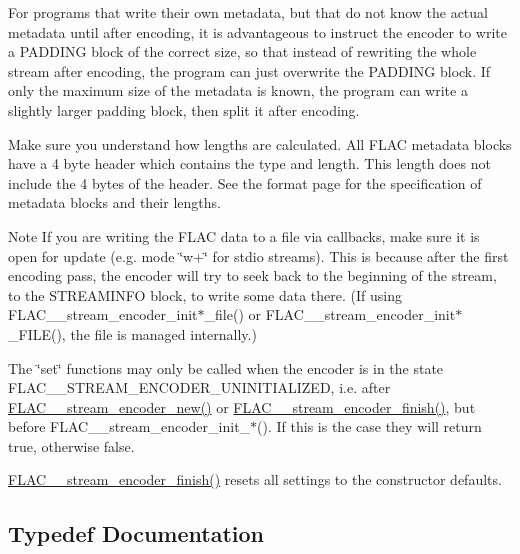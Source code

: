 For programs that write their own metadata, but that do not know the actual metadata until after encoding, it is advantageous to instruct the encoder to write a P\+A\+D\+D\+I\+NG block of the correct size, so that instead of rewriting the whole stream after encoding, the program can just overwrite the P\+A\+D\+D\+I\+NG block. If only the maximum size of the metadata is known, the program can write a slightly larger padding block, then split it after encoding.

Make sure you understand how lengths are calculated. All F\+L\+AC metadata blocks have a 4 byte header which contains the type and length. This length does not include the 4 bytes of the header. See the format page for the specification of metadata blocks and their lengths.

\begin{DoxyNote}{Note}
If you are writing the F\+L\+AC data to a file via callbacks, make sure it is open for update (e.\+g. mode \char`\"{}w+\char`\"{} for stdio streams). This is because after the first encoding pass, the encoder will try to seek back to the beginning of the stream, to the S\+T\+R\+E\+A\+M\+I\+N\+FO block, to write some data there. (If using F\+L\+A\+C\+\_\+\+\_\+stream\+\_\+encoder\+\_\+init$\ast$\+\_\+file() or F\+L\+A\+C\+\_\+\+\_\+stream\+\_\+encoder\+\_\+init$\ast$\+\_\+\+F\+I\+LE(), the file is managed internally.)

The \char`\"{}set\char`\"{} functions may only be called when the encoder is in the state F\+L\+A\+C\+\_\+\+\_\+\+S\+T\+R\+E\+A\+M\+\_\+\+E\+N\+C\+O\+D\+E\+R\+\_\+\+U\+N\+I\+N\+I\+T\+I\+A\+L\+I\+Z\+ED, i.\+e. after \mbox{\hyperlink{group__flac__stream__encoder_ga35f3d94452bcf0a90a31c7d770b200bc}{F\+L\+A\+C\+\_\+\+\_\+stream\+\_\+encoder\+\_\+new()}} or \mbox{\hyperlink{group__flac__stream__encoder_gab2c1e5477c1e3fe9ad0d722ff8eecda2}{F\+L\+A\+C\+\_\+\+\_\+stream\+\_\+encoder\+\_\+finish()}}, but before F\+L\+A\+C\+\_\+\+\_\+stream\+\_\+encoder\+\_\+init\+\_\+$\ast$(). If this is the case they will return {\ttfamily true}, otherwise {\ttfamily false}.

\mbox{\hyperlink{group__flac__stream__encoder_gab2c1e5477c1e3fe9ad0d722ff8eecda2}{F\+L\+A\+C\+\_\+\+\_\+stream\+\_\+encoder\+\_\+finish()}} resets all settings to the constructor defaults. 
\end{DoxyNote}


\subsection{Typedef Documentation}
\mbox{\label{group__flac__stream__encoder_ga091fbf3340d85bcbda1090c31bc320cf}} 
